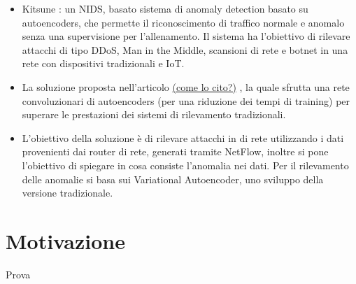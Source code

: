\begin{itemize}
\item Kitsune \cite{kitsune}: un NIDS, basato sistema di anomaly detection basato su autoencoders, che permette il riconoscimento di traffico normale e anomalo senza una supervisione per l'allenamento. Il sistema ha l'obiettivo di rilevare attacchi di tipo DDoS, Man in the Middle, scansioni di rete e botnet in una rete con dispositivi tradizionali e IoT.
\item La soluzione proposta nell'articolo  \uline{(come lo cito?)} \cite{chen_autoencoders}, la quale sfrutta una rete convoluzionari di autoencoders (per una riduzione dei tempi di training) per superare le prestazioni dei sistemi di rilevamento tradizionali.
\item L'obiettivo della soluzione \cite{vae_autoencoders} è di rilevare attacchi in di rete utilizzando i dati provenienti dai router di rete, generati tramite NetFlow, inoltre si pone l'obiettivo di spiegare in cosa consiste l'anomalia nei dati. Per il rilevamento delle anomalie si basa sui Variational Autoencoder, uno sviluppo della versione tradizionale.

\end{itemize}

\section{Motivazione}
Prova 



